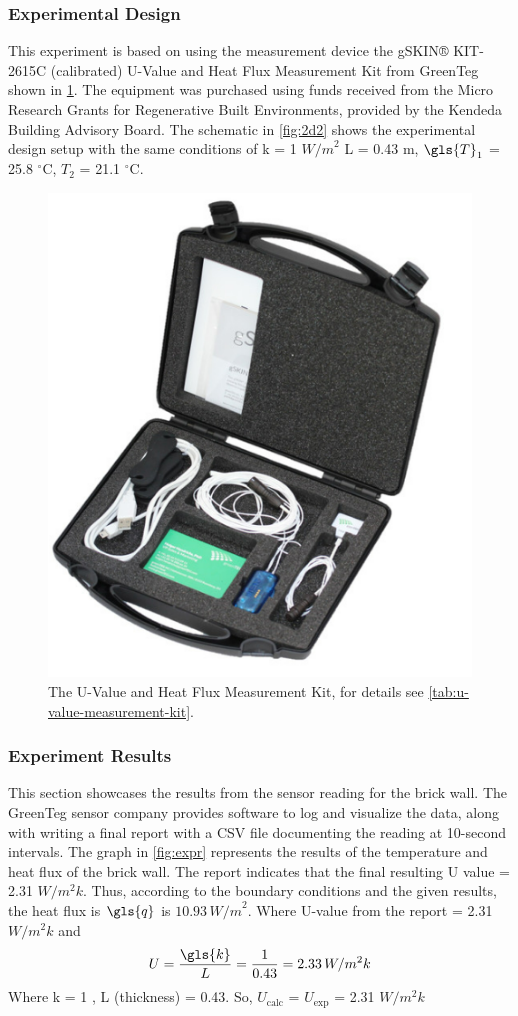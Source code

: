 



 
\subsubsection{Experimental Design}
 This experiment is based on using the measurement device the gSKIN® KIT-2615C (calibrated) U-Value and Heat Flux Measurement Kit from GreenTeg  \cite{greenteg} shown in \ref{fig:toolkit}. The equipment was purchased using funds received from the Micro Research Grants for Regenerative Built Environments, provided by the Kendeda Building Advisory Board\cite{kendeda}.
 The schematic in \cref{fig:2d2} shows the experimental design setup with the same conditions of k  = 1 ${W/m}^2$ 
\gls{L}  = 0.43 m,
$\gls{T}_1$ = 25.8 $^\circ \text{C}$, 
$T_2$  = 21.1  $^\circ \text{C}$.

\begin{figure}[tbh]
     \centering
    \includegraphics[width=0.5\linewidth]{Figures/greenteg.png}
     \caption[U-value measurement Kit]{The U-Value and Heat Flux Measurement Kit, for details see \cref{tab:u-value-measurement-kit}.}
   \label{fig:toolkit}
 \end{figure}






\subsubsection{Experiment Results}
This section showcases the results from the sensor reading for the brick wall. The GreenTeg sensor company provides software to log and visualize the data, along with writing a final report with a CSV file documenting the reading at 10-second intervals. The graph in \ref{fig:expr} represents the results of the temperature and heat flux of the brick wall. 
The report indicates that the final resulting U value = 2.31 ${W/m^2k}$. Thus, according to the boundary conditions and the given results, the heat flux is \( \gls{q} \) is \( 10.93\, {W/m}^2 \). 
Where U-value from the report = 2.31\, ${W/m^2k}$ and 
\begin{equation}
    U = \frac{\gls{k}}{L}
      = \frac{1}{0.43} = 2.33\,  {W/m^2k}
\end{equation}
Where k = 1 , L (thickness) = 0.43. So, \(U_{\text{calc}}\) = \(U_{\text{exp}}\) = 2.31 ${W/m^2k}$ 

